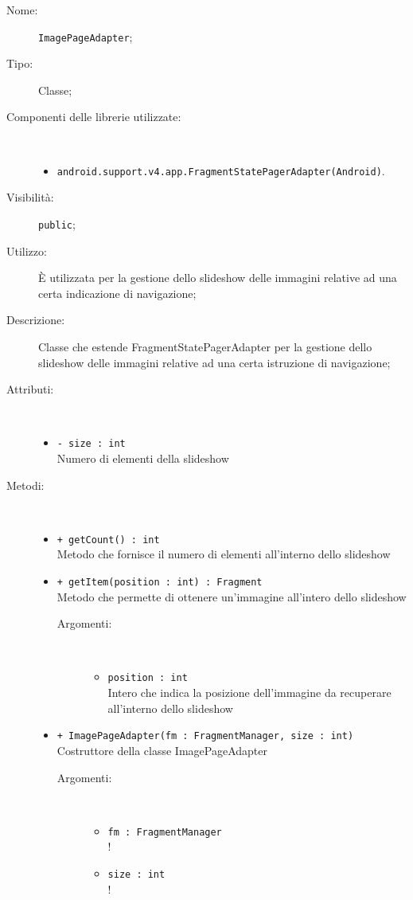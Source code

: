 \documentclass[../DefinizioneDiProdotto.tex]{subfiles}
\begin{document}
    \begin{description}
\item[Nome:] \texttt{ImagePageAdapter};
\item[Tipo:] Classe;
\item[Componenti delle librerie utilizzate:] \
\begin{itemize}
\item \texttt{android.support.v4.app.FragmentStatePagerAdapter(Android)}.

\end{itemize}
\item[Visibilità:] \texttt{public};
\item[Utilizzo:] È utilizzata per la gestione dello slideshow delle immagini relative ad una certa indicazione di navigazione;
\item[Descrizione:] Classe che estende FragmentStatePagerAdapter per la gestione dello slideshow delle immagini relative ad una certa istruzione di navigazione;
\item[Attributi:] \
\begin{itemize}
\item \texttt{- size : int}\\
Numero di elementi della slideshow

\end{itemize}
\item[Metodi:] \
\begin{itemize}
\item \texttt{+ getCount() : int}\\
Metodo che fornisce il numero di elementi all'interno dello slideshow
 \item \texttt{+ getItem(position : int) : Fragment}\\
Metodo che permette di ottenere un'immagine all'intero dello slideshow
 \begin{description}
\item[Argomenti:] \
\begin{itemize}
\item \texttt{position : int}\\
Intero che indica la posizione dell'immagine da recuperare all'interno dello slideshow\end{itemize}
\end{description}
\item \texttt{+ ImagePageAdapter(fm : FragmentManager, size : int)}\\
Costruttore della classe ImagePageAdapter
 \begin{description}
\item[Argomenti:] \
\begin{itemize}
\item \texttt{fm : FragmentManager}\\
!\item \texttt{size : int}\\
!\end{itemize}
\end{description}
\end{itemize}
\end{description}
\end{document}
